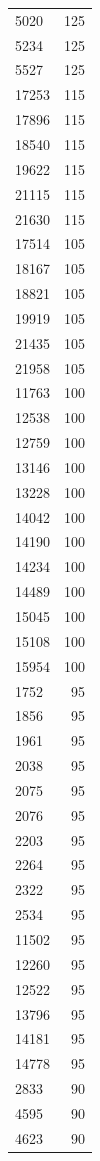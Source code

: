 \begin{table}[ht]
\begin{tabular}{lr}
  5020 & 125 \\ 
  5234 & 125 \\ 
  5527 & 125 \\ 
  17253 & 115 \\ 
  17896 & 115 \\ 
  18540 & 115 \\ 
  19622 & 115 \\ 
  21115 & 115 \\ 
  21630 & 115 \\ 
  17514 & 105 \\ 
  18167 & 105 \\ 
  18821 & 105 \\ 
  19919 & 105 \\ 
  21435 & 105 \\ 
  21958 & 105 \\ 
  11763 & 100 \\ 
  12538 & 100 \\ 
  12759 & 100 \\ 
  13146 & 100 \\ 
  13228 & 100 \\ 
  14042 & 100 \\ 
  14190 & 100 \\ 
  14234 & 100 \\ 
  14489 & 100 \\ 
  15045 & 100 \\ 
  15108 & 100 \\ 
  15954 & 100 \\ 
  1752 &  95 \\ 
  1856 &  95 \\ 
  1961 &  95 \\ 
  2038 &  95 \\ 
  2075 &  95 \\ 
  2076 &  95 \\ 
  2203 &  95 \\ 
  2264 &  95 \\ 
  2322 &  95 \\ 
  2534 &  95 \\ 
  11502 &  95 \\ 
  12260 &  95 \\ 
  12522 &  95 \\ 
  13796 &  95 \\ 
  14181 &  95 \\ 
  14778 &  95 \\ 
  2833 &  90 \\ 
  4595 &  90 \\ 
  4623 &  90 \\ 

\end{tabular}
\end{table}

